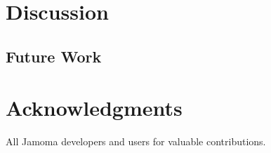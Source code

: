 \documentclass{sig-alternate}
\begin{document}
\section{Discussion}


\subsection{Future Work}




\section{Acknowledgments}
All Jamoma developers and users for valuable contributions. 


%

%


\balancecolumns %
\end{document}
